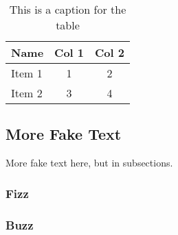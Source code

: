 \begin{table}
\centering %
\begin{tabular}{l|cc} %
Name & Col 1 & Col 2 \\ %
\hline %
Item 1 & 1 & 2 \\
Item 2 & 3 & 4\\
\end{tabular}
\caption{This is a caption for the table}
\label{t:my_table}
\end{table}

\subsection{More Fake Text}
More fake text here, but in subsections.

\subsubsection{Fizz}
\lipsum[6-8]

\subsubsection{Buzz}
\lipsum[9-10]

